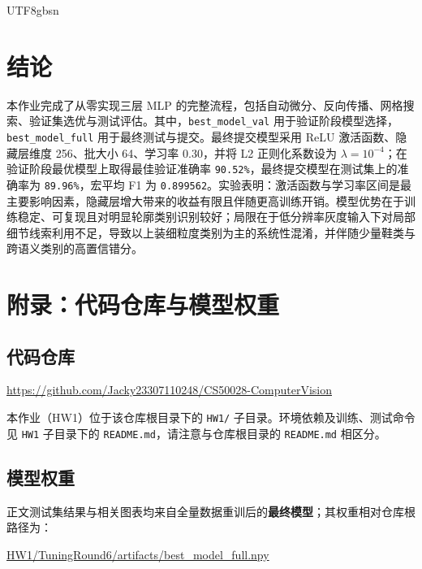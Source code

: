 \documentclass[11pt]{article}
\begin{document}
\begin{CJK*}{UTF8}{gbsn}
\section{结论}
本作业完成了从零实现三层 MLP 的完整流程，包括自动微分、反向传播、网格搜索、验证集选优与测试评估。其中，\texttt{best\_model\_val} 用于验证阶段模型选择，\texttt{best\_model\_full} 用于最终测试与提交。最终提交模型采用 ReLU 激活函数、隐藏层维度 256、批大小 64、学习率 0.30，并将 L2 正则化系数设为 $\lambda=10^{-4}$；在验证阶段最优模型上取得最佳验证准确率 \texttt{90.52\%}，最终提交模型在测试集上的准确率为 \texttt{89.96\%}，宏平均 F1 为 \texttt{0.899562}。实验表明：激活函数与学习率区间是最主要影响因素，隐藏层增大带来的收益有限且伴随更高训练开销。模型优势在于训练稳定、可复现且对明显轮廓类别识别较好；局限在于低分辨率灰度输入下对局部细节线索利用不足，导致以上装细粒度类别为主的系统性混淆，并伴随少量鞋类与跨语义类别的高置信错分。

\appendix
\section{附录：代码仓库与模型权重}
\begingroup
\raggedright
\sloppy

\subsection{代码仓库}
\noindent\url{https://github.com/Jacky23307110248/CS50028-ComputerVision}

\vspace{0.35em}
\noindent 本作业（HW1）位于该仓库根目录下的 \texttt{HW1/} 子目录。环境依赖及训练、测试命令见 \texttt{HW1} 子目录下的 \texttt{README.md}，请注意与仓库根目录的 \texttt{README.md} 相区分。

\subsection{模型权重}
\noindent 正文测试集结果与相关图表均来自全量数据重训后的\textbf{最终模型}；其权重相对仓库根路径为：\par
\noindent\url{HW1/TuningRound6/artifacts/best_model_full.npy}

\endgroup

\ifXeTeX\else\end{CJK*}\fi
\end{document}
